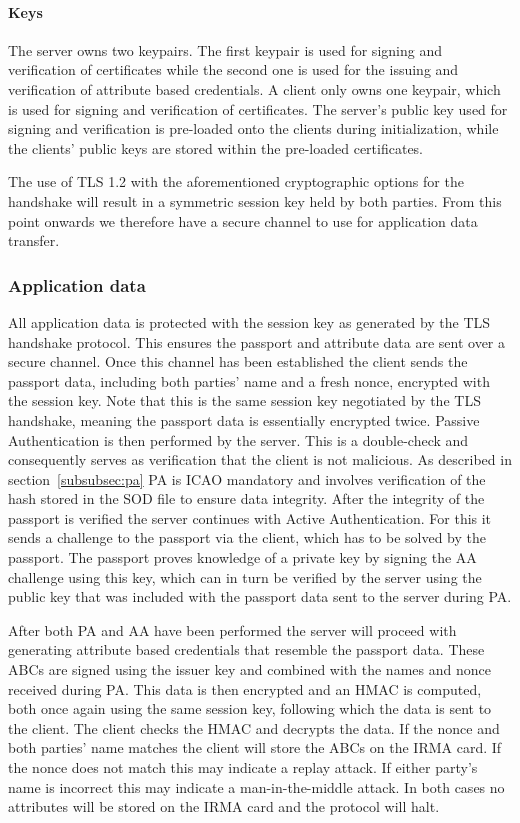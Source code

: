 \paragraph{Keys}
The server owns two keypairs. The first keypair is used for signing and verification of certificates while the second one is used for the issuing and verification of attribute based credentials. A client only owns one keypair, which is used for signing and verification of certificates. The server's public key used for signing and verification is pre-loaded onto the clients during initialization, while the clients' public keys are stored within the pre-loaded certificates.

The use of TLS 1.2 with the aforementioned cryptographic options for the handshake will result in a symmetric session key held by both parties. From this point onwards we therefore have a secure channel to use for application data transfer.

\subsubsection{Application data}
All application data is protected with the session key as generated by the TLS handshake protocol. This ensures the passport and attribute data are sent over a secure channel. Once this channel has been established the client sends the passport data, including both parties' name and a fresh nonce, encrypted with the session key. Note that this is the same session key negotiated by the TLS handshake, meaning the passport data is essentially encrypted twice. Passive Authentication is then performed by the server. This is a double-check and consequently serves as verification that the client is not malicious. As described in section~\ref{subsubsec:pa} PA is ICAO mandatory and involves verification of the hash stored in the SOD file to ensure data integrity. After the integrity of the passport is verified the server continues with Active Authentication. For this it sends a challenge to the passport via the client, which has to be solved by the passport. The passport proves knowledge of a private key by signing the AA challenge using this key, which can in turn be verified by the server using the public key that was included with the passport data sent to the server during PA.

After both PA and AA have been performed the server will proceed with generating attribute based credentials that resemble the passport data. These ABCs are signed using the issuer key and combined with the names and nonce received during PA. This data is then encrypted and an HMAC is computed, both once again using the same session key, following which the data is sent to the client. The client checks the HMAC and decrypts the data. If the nonce and both parties' name matches the client will store the ABCs on the IRMA card. If the nonce does not match this may indicate a replay attack. If either party's name is incorrect this may indicate a man-in-the-middle attack. In both cases no attributes will be stored on the IRMA card and the protocol will halt.
